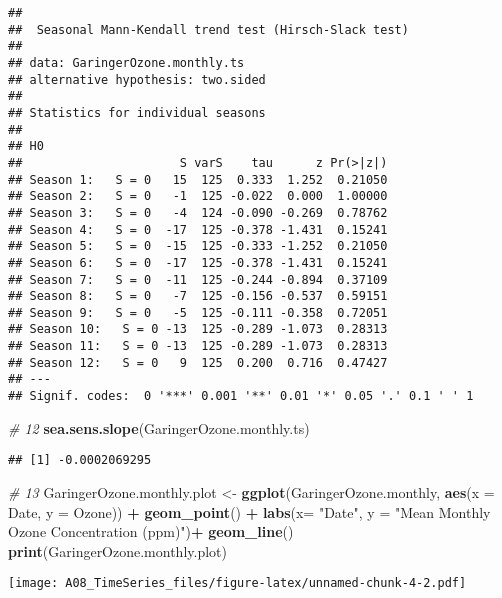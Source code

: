 \documentclass[]{article}
\newenvironment{Shaded}{\begin{snugshade}}{\end{snugshade}}
\newcommand{\CommentTok}[1]{\textcolor[rgb]{0.56,0.35,0.01}{\textit{#1}}}
\newcommand{\DataTypeTok}[1]{\textcolor[rgb]{0.13,0.29,0.53}{#1}}
\newcommand{\KeywordTok}[1]{\textcolor[rgb]{0.13,0.29,0.53}{\textbf{#1}}}
\newcommand{\NormalTok}[1]{#1}
\newcommand{\OperatorTok}[1]{\textcolor[rgb]{0.81,0.36,0.00}{\textbf{#1}}}
\newcommand{\StringTok}[1]{\textcolor[rgb]{0.31,0.60,0.02}{#1}}
\begin{document}
\begin{verbatim}
## 
##  Seasonal Mann-Kendall trend test (Hirsch-Slack test)
## 
## data: GaringerOzone.monthly.ts
## alternative hypothesis: two.sided
## 
## Statistics for individual seasons
## 
## H0
##                      S varS    tau      z Pr(>|z|)  
## Season 1:   S = 0   15  125  0.333  1.252  0.21050  
## Season 2:   S = 0   -1  125 -0.022  0.000  1.00000  
## Season 3:   S = 0   -4  124 -0.090 -0.269  0.78762  
## Season 4:   S = 0  -17  125 -0.378 -1.431  0.15241  
## Season 5:   S = 0  -15  125 -0.333 -1.252  0.21050  
## Season 6:   S = 0  -17  125 -0.378 -1.431  0.15241  
## Season 7:   S = 0  -11  125 -0.244 -0.894  0.37109  
## Season 8:   S = 0   -7  125 -0.156 -0.537  0.59151  
## Season 9:   S = 0   -5  125 -0.111 -0.358  0.72051  
## Season 10:   S = 0 -13  125 -0.289 -1.073  0.28313  
## Season 11:   S = 0 -13  125 -0.289 -1.073  0.28313  
## Season 12:   S = 0   9  125  0.200  0.716  0.47427  
## ---
## Signif. codes:  0 '***' 0.001 '**' 0.01 '*' 0.05 '.' 0.1 ' ' 1
\end{verbatim}

\begin{Shaded}
\begin{Highlighting}[]
\CommentTok{# 12}
\KeywordTok{sea.sens.slope}\NormalTok{(GaringerOzone.monthly.ts)}
\end{Highlighting}
\end{Shaded}

\begin{verbatim}
## [1] -0.0002069295
\end{verbatim}

\begin{Shaded}
\begin{Highlighting}[]
\CommentTok{# 13}
\NormalTok{GaringerOzone.monthly.plot <-}\StringTok{ }\KeywordTok{ggplot}\NormalTok{(GaringerOzone.monthly, }\KeywordTok{aes}\NormalTok{(}\DataTypeTok{x =}\NormalTok{ Date, }\DataTypeTok{y =}\NormalTok{ Ozone)) }\OperatorTok{+}
\StringTok{  }\KeywordTok{geom_point}\NormalTok{() }\OperatorTok{+}
\StringTok{  }\KeywordTok{labs}\NormalTok{(}\DataTypeTok{x=} \StringTok{"Date"}\NormalTok{, }\DataTypeTok{y =} \StringTok{"Mean Monthly Ozone Concentration (ppm)"}\NormalTok{)}\OperatorTok{+}
\StringTok{  }\KeywordTok{geom_line}\NormalTok{()}
\KeywordTok{print}\NormalTok{(GaringerOzone.monthly.plot)}
\end{Highlighting}
\end{Shaded}

\texttt{[image: A08\_TimeSeries\_files/figure-latex/unnamed-chunk-4-2.pdf]}
\end{document}
